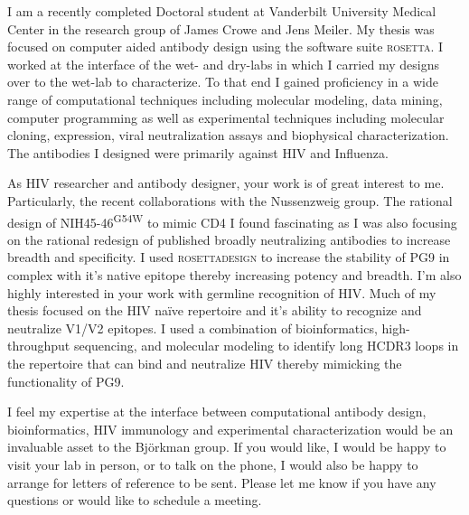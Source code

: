 \documentclass[11pt,stdletter,sigleft]{newlfm}
\begin{document}
\begin{newlfm}
I am a recently completed Doctoral student at Vanderbilt University Medical Center in the research group of James Crowe and Jens Meiler. My thesis was focused on computer aided antibody design using the software suite \textsc{rosetta}. I worked at the interface of the wet- and dry-labs in which I carried my designs over to the wet-lab to characterize. To that end I gained proficiency in a wide range of computational techniques including molecular modeling, data mining,  computer programming as well as experimental techniques including molecular cloning, expression, viral neutralization assays and biophysical characterization. The antibodies I designed were primarily against HIV and Influenza.


As HIV researcher and antibody designer, your work is of great interest to me. Particularly, the recent collaborations with the Nussenzweig group. The rational design of NIH45-46\textsuperscript{G54W} to mimic CD4 I found fascinating as I was also focusing on the rational redesign of published broadly neutralizing antibodies to increase breadth and specificity. I used \textsc{rosettadesign} to increase the stability of PG9 in complex with it's native epitope thereby increasing potency and breadth. I'm also highly interested in your work with germline recognition of HIV. Much of my thesis focused on the HIV na\"{i}ve repertoire and it's ability to recognize and neutralize V1/V2 epitopes. I used a combination of bioinformatics, high-throughput sequencing, and molecular modeling to identify long HCDR3 loops in the repertoire that can bind and neutralize HIV thereby mimicking the functionality of PG9.

I feel my expertise at the interface between computational antibody design, bioinformatics, HIV immunology and experimental characterization would be an invaluable asset to the  Bj\"{o}rkman group.  If you would like, I would be happy to visit your lab in person, or to talk on the phone, I would also be happy to arrange for letters of reference to be sent. Please let me know if you have any questions or would like to schedule a meeting.


\end{newlfm}
\end{document}
